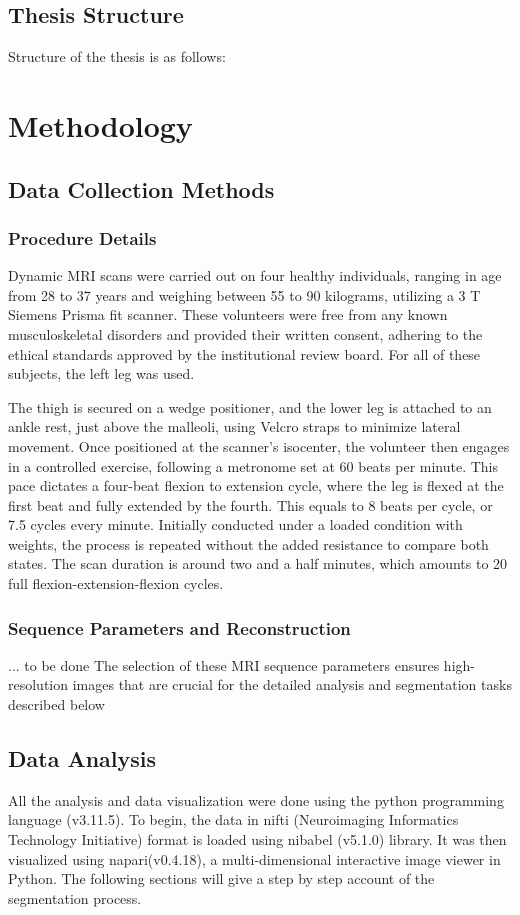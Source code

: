 \documentclass{micro-econ-thesis}
\begin{document}
\subsection{Thesis Structure}
Structure of the thesis is as follows: 


\section{Methodology}
\label{sec:second}

\subsection{Data Collection Methods}

\subsubsection{Procedure Details}
Dynamic MRI scans were carried out on four healthy individuals, ranging in age from 28 to 37 years and weighing between 55 to 90 kilograms, utilizing a 3 T Siemens Prisma fit scanner. These volunteers were free from any known musculoskeletal disorders and provided their written consent, adhering to the ethical standards approved by the institutional review board. For all of these subjects, the left leg was used. 

The thigh is secured on a wedge positioner, and the lower leg is attached to an ankle rest, just above the malleoli, using Velcro straps to minimize lateral movement. Once positioned at the scanner's isocenter, the volunteer then engages in a controlled exercise, following a metronome set at 60 beats per minute. This pace dictates a four-beat flexion to extension cycle, where the leg is flexed at the first beat and fully extended by the fourth. This equals to 8 beats per cycle, or 7.5 cycles every minute. Initially conducted under a loaded condition with weights, the process is repeated without the added resistance to compare both states. The scan duration is around two and a half minutes, which amounts to 20 full flexion-extension-flexion cycles. 

\subsubsection{Sequence Parameters and Reconstruction}
... to be done 
The selection of these MRI sequence parameters ensures high-resolution images that are crucial for the detailed analysis and segmentation tasks described below
\subsection{Data Analysis}
All the analysis and data visualization were done using the python programming language (v3.11.5). To begin, the data in nifti (Neuroimaging Informatics Technology Initiative) format is loaded using nibabel (v5.1.0) library. It was then visualized using napari(v0.4.18), a multi-dimensional interactive image viewer in Python. The following sections will give a step by step account of the segmentation process.  
\end{document}
